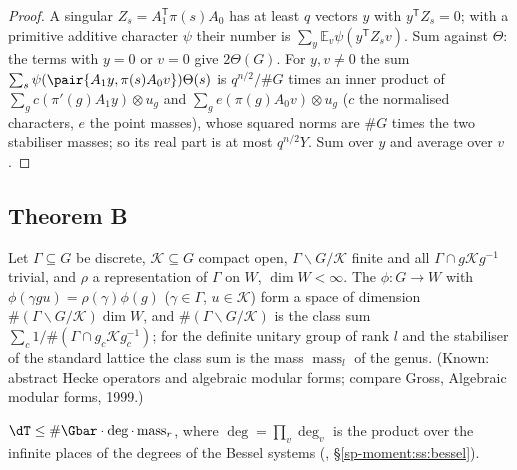 \begin{proof}
A singular $Z_s=A_1^{\mathsf T}\pi(s)A_0$ has at least $q$ vectors $y$ with $y^{\mathsf T}Z_s=0$;
with a primitive additive character $\psi$ their number is $\sum_y\mathbb E_v\psi(y^{\mathsf T}
Z_sv)$. Sum against $\Theta$: the terms with $y=0$ or $v=0$ give $2\Theta(G)$. For $y,v\ne0$ the
sum $\sum_s\psi(\pair{A_1y,\pi(s)A_0v})\Theta(s)$ is $q^{n/2}/\#G$ times an inner product of
$\sum_gc(\pi'(g)A_1y)\otimes u_g$ and $\sum_ge(\pi(g)A_0v)\otimes u_g$ ($c$ the normalised
characters, $e$ the point masses), whose squared norms are $\#G$ times the two stabiliser masses;
so its real part is at most $q^{n/2}Y$. Sum over $y$ and average over $v$.
\end{proof}

\subsection{Theorem B}\label{sp-moment:ss:B}

\begin{fact}
\label{sp-moment:fact:dim}
Let $\Gamma\subseteq G$ be discrete, $\mathcal K\subseteq G$ compact open, $\Gamma\backslash G/\mathcal K$ finite
and all $\Gamma\cap g\mathcal Kg^{-1}$ trivial, and $\rho$ a representation of $\Gamma$ on $W$,
$\dim W<\infty$. The $\phi\colon G\to W$ with $\phi(\gamma gu)=\rho(\gamma)\phi(g)$ ($\gamma\in\Gamma$, $u\in\mathcal K$) form a space of
dimension $\#(\Gamma\backslash G/\mathcal K)\dim W$, and $\#(\Gamma\backslash G/\mathcal K)$ is the class sum
$\sum_c1/\#(\Gamma\cap g_c\mathcal Kg_c^{-1})$; for the definite unitary group of rank $l$ and the
stabiliser of the standard lattice the class sum is the mass $\operatorname{mass}_l$ of the genus.
(Known: abstract Hecke operators and algebraic modular forms; compare Gross, Algebraic modular
forms, 1999.)
\end{fact}

\begin{proposition}\label{sp-moment:prop:dim}
$\dT\le\#\Gbar\cdot\deg\cdot\operatorname{mass}_r$, where $\deg=\prod_v\deg_v$ is the product over
the infinite places of the degrees of the Bessel systems (,
\S\ref{sp-moment:ss:bessel}).
\end{proposition}

